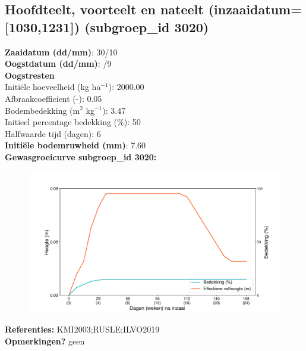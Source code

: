 \documentclass{article}
\begin{document}
 \subsection{Hoofdteelt, voorteelt en nateelt (inzaaidatum=[1030,1231]) (subgroep\_id 3020)} 
  \textbf{Zaaidatum (dd/mm)}: 30/10  \vspace{0.10cm} \\ 
  \textbf{Oogstdatum (dd/mm)}: /9  \vspace{0.10cm} \\ 
  \textbf{Oogstresten} \vspace{0.05cm} \\ 
  \tab Initi\"{e}le hoeveelheid (kg ha$^{-1}$): 2000.00 \vspace{0.05cm} \\ 
  \tab Afbraakcoefficient (-): 0.05 \vspace{0.05cm} \\ 
  \tab Bodembedekking (m$^2$ kg$^{-1}$): 3.47 \vspace{0.05cm} \\ 
  \tab Initieel percentage bedekking (\%): 50 \vspace{0.05cm} \\ 
  \tab Halfwaarde tijd (dagen): 6 \vspace{0.05cm} \\ 
  \textbf{Initi\"{e}le bodemruwheid (mm)}: 7.60 \vspace{0.05cm} \\ 
  \textbf{Gewasgroeicurve subgroep\_id 3020:} 
 \begin{center} \begin{figure}[H] \includegraphics[width=12.5cm]{temp/3020.png} \end{figure} \end{center} 
  \textbf{Referenties:} KMI2003;RUSLE;ILVO2019 \vspace{0.10cm} \\ 
  \textbf{Opmerkingen?} geen \vspace{0.10cm} \\ 
 \newpage 
\end{document}
